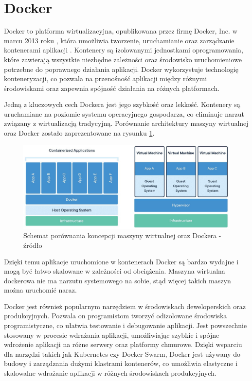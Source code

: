 \section{Docker}

Docker to platforma wirtualizacyjna, opublikowana przez firmę Docker, Inc. w marcu 2013 roku \cite{archiveDotCloudAbout}, która umożliwia tworzenie, uruchamianie oraz zarządzanie kontenerami aplikacji \cite{dockerHome}. 
Kontenery są izolowanymi jednostkami oprogramowania, które zawierają wszystkie niezbędne zależności oraz środowisko uruchomieniowe potrzebne do poprawnego działania aplikacji.
Docker wykorzystuje technologię konteneryzacji, co pozwala na przenośność aplikacji między różnymi środowiskami oraz zapewnia spójność działania na różnych platformach.

Jedną z kluczowych cech Dockera jest jego szybkość oraz lekkość.
Kontenery są uruchamiane na poziomie systemu operacyjnego gospodarza, co eliminuje narzut związany z wirtualizacją tradycyjną.
Porównanie architektury maszyny wirtualnej oraz Docker zostało zaprezentowane na rysunku \ref{rys:docker-vs-vm}.

\begin{figure}[!hb]
	\centering \includegraphics[width=1\linewidth]{rysunki/docker-vs-vm.jpg}
	\caption{Schemat porównania koncepcji maszyny wirtualnej oraz Dockera - źródło \cite{cherryserversOverview}}
	\label{rys:docker-vs-vm}
\end{figure}

Dzięki temu aplikacje uruchomione w kontenerach Docker są bardzo wydajne i mogą być łatwo skalowane w zależności od obciążenia.
Maszyna wirtualna dockerowa nie ma narzutu systemowego na sobie, stąd więcej takich maszyn można uruchomić naraz.

Docker jest również popularnym narzędziem w środowiskach deweloperskich oraz produkcyjnych.
Pozwala on programistom tworzyć odizolowane środowiska programistyczne, co ułatwia testowanie i debugowanie aplikacji.
Jest powszechnie stosowany w procesie wdrażania aplikacji, umożliwiając szybkie i spójne wdrożenie aplikacji na różne serwery oraz platformy chmurowe.
Dzięki wsparciu dla narzędzi takich jak Kubernetes czy Docker Swarm, Docker jest używany do budowy i zarządzania dużymi klastrami kontenerów, co umożliwia elastyczne i skalowalne wdrażanie aplikacji w różnych środowiskach produkcyjnych.

